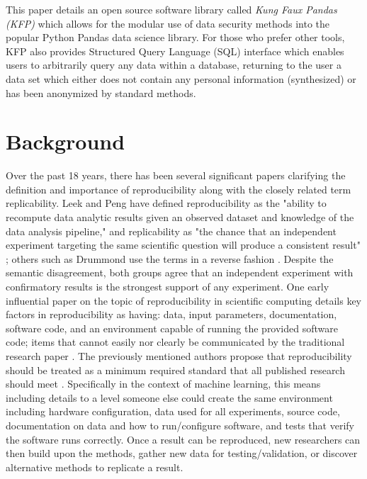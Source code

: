 \documentclass{article}
\begin{document}
This paper details an open source software library called \emph{Kung Faux Pandas (KFP)} which allows for the modular use of data security methods into the popular Python Pandas data science library. For those who prefer other tools, KFP also provides Structured Query Language (SQL) interface which enables users to arbitrarily query any data within a database, returning to the user a data set which either does not contain any personal information (synthesized) or has been anonymized by standard methods.

\section{Background}

 Over the past 18 years, there has been several significant papers clarifying the definition and importance of reproducibility along with the closely related term replicability. Leek and Peng have defined reproducibility as the "ability to recompute data analytic results given an observed dataset and knowledge of the data analysis pipeline," and replicability as "the chance that an independent experiment targeting the same scientific question will produce a consistent result" \cite{leek_opinion_2015}; others such as Drummond use the terms in a reverse fashion \cite{drummond_replicability_2009}. Despite the semantic disagreement, both groups agree that an independent experiment with confirmatory results is the strongest support of any experiment. One early influential paper on the topic of reproducibility in scientific computing details key factors in reproducibility as having: data, input parameters, documentation, software code, and an environment capable of running the provided software code; items that cannot easily nor clearly be communicated by the traditional research paper \cite{schwab_making_2000}. The previously mentioned authors propose that reproducibility should be treated as a minimum required standard that all published research should meet \cite{peng_reproducible_2006}. Specifically in the context of machine learning, this means including details to a level someone else could create the same environment including hardware configuration, data used for all experiments, source code, documentation on data and how to run/configure software, and tests that verify the software runs correctly. Once a result can be reproduced, new researchers can then build upon the methods, gather new data for testing/validation, or discover alternative methods to replicate a result.
\end{document}
